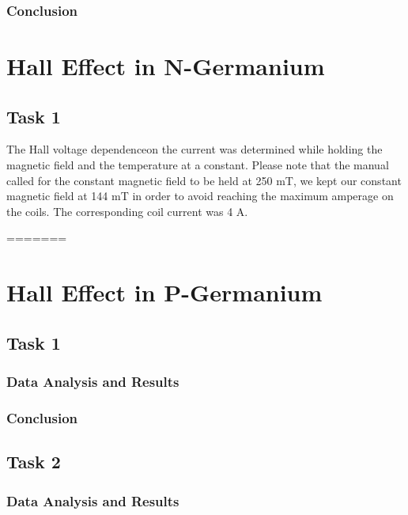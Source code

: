 \documentclass[a4paper]{article}
\begin{document}
\subsubsection{Conclusion}


\section{Hall Effect in N-Germanium}

\subsection{Task 1}

\qq The Hall voltage dependenceon the current was determined while
holding the magnetic field and the temperature at a constant. Please
note that the manual called for the constant magnetic field to be held
at 250 mT, we kept our constant magnetic field at 144 mT in order to
avoid reaching the maximum amperage on the coils. The corresponding
coil current was 4 A.

=======
\section{Hall Effect in P-Germanium}

\subsection{Task 1}

\subsubsection{Data Analysis and Results}

\subsubsection{Conclusion}

\subsection{Task 2}

\subsubsection{Data Analysis and Results}
\end{document}
